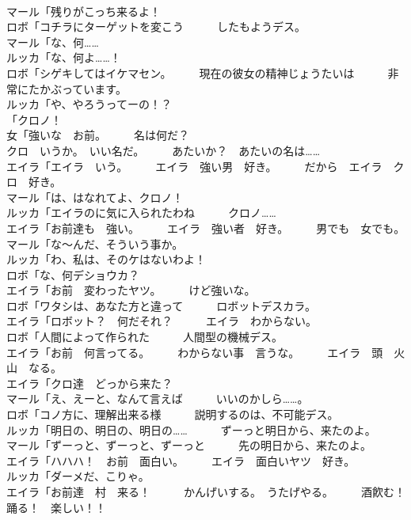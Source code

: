 \documentclass[8pt]{extreport}
\begin{document}
\begin{CJK}{UTF8}{min}
\\	マール「残りがこっち来るよ！	
\\	ロボ「コチラにターゲットを変こう　　　したもようデス。	
\\	マール「な、何……	
\\	ルッカ「な、何よ……！	
\\	ロボ「シゲキしてはイケマセン。　　　現在の彼女の精神じょうたいは　　　非常にたかぶっています。	
\\	ルッカ「や、やろうってーの！？	
\\	「クロノ！	
\\	女「強いな　お前。　　　名は何だ？	
\\	クロ　いうか。　いい名だ。　　　あたいか？　あたいの名は……	
\\	エイラ「エイラ　いう。　　　エイラ　強い男　好き。　　　だから　エイラ　クロ　好き。	
\\	マール「は、はなれてよ、クロノ！	
\\	ルッカ「エイラのに気に入られたわね　　　クロノ……	
\\	エイラ「お前達も　強い。　　　エイラ　強い者　好き。　　　男でも　女でも。	
\\	マール「な～んだ、そういう事か。	
\\	ルッカ「わ、私は、そのケはないわよ！	
\\	ロボ「な、何デショウカ？	
\\	エイラ「お前　変わったヤツ。　　　けど強いな。	
\\	ロボ「ワタシは、あなた方と違って　　　ロボットデスカラ。	
\\	エイラ「ロボット？　何だそれ？　　　エイラ　わからない。	
\\	ロボ「人間によって作られた　　　人間型の機械デス。	
\\	エイラ「お前　何言ってる。　　　わからない事　言うな。　　　エイラ　頭　火山　なる。	
\\	エイラ「クロ達　どっから来た？	
\\	マール「え、えーと、なんて言えば　　　いいのかしら……。	
\\	ロボ「コノ方に、理解出来る様　　　説明するのは、不可能デス。	
\\	ルッカ「明日の、明日の、明日の……　　　ずーっと明日から、来たのよ。	
\\	マール「ずーっと、ずーっと、ずーっと　　　先の明日から、来たのよ。	
\\	エイラ「ハハハ！　お前　面白い。　　　エイラ　面白いヤツ　好き。	
\\	ルッカ「ダーメだ、こりゃ。	
\\	エイラ「お前達　村　来る！　　　かんげいする。　うたげやる。　　　酒飮む！　踊る！　楽しい！！	

\end{CJK}
\end{document}
